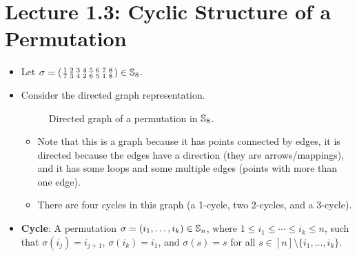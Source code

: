 \documentclass[../main.tex]{subfiles}
\begin{document}
\section{Lecture 1.3: Cyclic Structure of a Permutation}
\begin{itemize}
    \item Let $
        \sigma=\left(
            \begin{smallmatrix}
                1 & 2 & 3 & 4 & 5 & 6 & 7 & 8\\
                7 & 3 & 4 & 2 & 6 & 5 & 1 & 8\\
            \end{smallmatrix}
        \right)\in\mathbb{S}_8
    $.
    \item Consider the directed graph representation.
    \begin{figure}[h!]
        \centering
        \caption{Directed graph of a permutation in $\mathbb{S}_8$.}
        \label{fig:directedGraphS8}
    \end{figure}
    \begin{itemize}
        \item Note that this is a graph because it has points connected by edges, it is directed because the edges have a direction (they are arrows/mappings), and it has some loops and some multiple edges (points with more than one edge).
        \item There are four cycles in this graph (a 1-cycle, two 2-cycles, and a 3-cycle).
    \end{itemize}
    \item \textbf{Cycle}: A permutation $\sigma=(i_1,\dots,i_k)\in\mathbb{S}_n$, where $1\leq i_1\leq\cdots\leq i_k\leq n$, such that $\sigma(i_j)=i_{j+1}$, $\sigma(i_k)=i_1$, and $\sigma(s)=s$ for all $s\in[n]\setminus\{i_1,\dots,i_k\}$.

\end{itemize}
\end{document}
